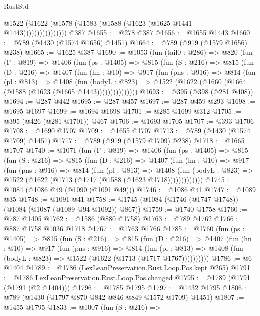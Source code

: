 \begin{lexlean}{RustStd}
\begin{coremodule}
{\begin{coremodule}
{{{{{{{                      @1522 (@1622 (@1578 (@1583 (@1588 (@1623 (@1625 @1441 @1443))))))))))))))))
    @387
@1655 := @278 @387
@1656 := @1655 @1443
@1660 := @789 (@1430 (@1574 @1656) @1451)
@1664 := @789 (@919 (@1579 @1656) @238)
@1665 := @1625 @387
@1690 := @1053
    (fun (tail0 : @286) =>
    @820
      (fun (Γ : @819) =>
      @1406
        (fun (ps : @1405) =>
        @815
          (fun (S : @216) =>
          @815
            (fun (D : @216) =>
            @1407
              (fun (hn : @10) =>
              @917
                (fun (pns : @916) =>
                @814
                  (fun (pl : @813) =>
                  @1408
                    (fun (bodyL : @823) =>
                    @1522 (@1622 (@1660 (@1664 (@1588 (@1623 (@1665 @1443)))))))))))))))
@1693 := @395 (@398 (@281 @408))
@1694 := @287 @442
@1695 := @287 @457
@1697 := @287 @459 @293
@1698 := @1695 @1697
@1699 := @1694 @1698
@1701 := @285 @1699 @312
@1705 := @395 (@426 (@281 @1701)) @467
@1706 := @1693 @1705
@1707 := @393 @1706
@1708 := @1690 @1707
@1709 := @1655 @1707
@1713 := @789 (@1430 (@1574 @1709) @1451)
@1717 := @789 (@919 (@1579 @1709) @238)
@1718 := @1665 @1707
@1740 := @1071
    (fun (Γ : @819) =>
    @1406
      (fun (ps : @1405) =>
      @815
        (fun (S : @216) =>
        @815
          (fun (D : @216) =>
          @1407
            (fun (hn : @10) =>
            @917
              (fun (pns : @916) =>
              @814
                (fun (pl : @813) =>
                @1408
                  (fun (bodyL : @823) => @1522 (@1622 (@1713 (@1717 (@1588 (@1623 @1718)))))))))))))
@1745 := @1084 (@1086 @49 (@1090 (@1091 @49)))
@1746 := @1086 @41
@1747 := @1089 @35
@1748 := @1091 @41
@1758 := @1745 (@1084 (@1746 (@1747 @1748)) (@1084 (@1087 (@1089 @94 @1092)) @867))
@1759 := @1740 @1758
@1760 := @787 @1405
@1762 := @1586 (@880 @1758)
@1763 := @789 @1762
@1766 := @887 @1758 @1036 @1718
@1767 := @1763 @1766
@1785 := @1760
    (fun (ps : @1405) =>
    @815
      (fun (S : @216) =>
      @815
        (fun (D : @216) =>
        @1407
          (fun (hn : @10) =>
          @917
            (fun (pns : @916) =>
            @814
              (fun (pl : @813) =>
              @1408 (fun (bodyL : @823) => @1522 (@1622 (@1713 (@1717 @1767))))))))))
@1786 := @6 @1404
@1789 := @1786 (LexLeanPreservation.Rust.Loop.Pos.kept @265)
@1791 := @1786 LexLeanPreservation.Rust.Loop.Pos.changed
@1795 := @1789 (@1791 (@1791 (@2 @1404)))
@1796 := @1785 @1795
@1797 := @1432 @1795
@1806 := @789 (@1430 (@1797 @870 @842 @846 @849 @1572 @1709) @1451)
@1807 := @1455 @1795
@1833 := @1007
    (fun (S : @216) =>
}}}}}}}
\end{coremodule}}
\end{coremodule}
\end{lexlean}
